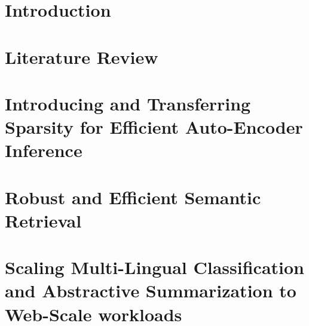 \documentclass[draftthesis,tocnosub,noragright,centerchapter,fullpagesingle,12pt]{uiuc_csthesis21}
\theoremstyle{definition}
\numberwithin{algocf}{chapter}
\begin{document}
\chapter{Introduction}
\label{chp:intro}
 
\chapter{Literature Review}
\label{chp:lit}
 
\chapter{Introducing and Transferring Sparsity for Efficient Auto-Encoder Inference}
\label{chp:sparse}
%
\chapter{Robust and Efficient Semantic Retrieval}
\label{chp:search}
%
\chapter{Scaling Multi-Lingual Classification and Abstractive Summarization to Web-Scale workloads}
\label{chp:Multi}
%

 
\appendix
\label{chp:appendix}
 
\backmatter
\end{document}
